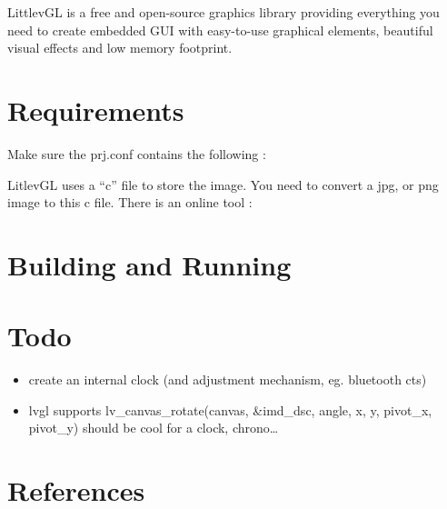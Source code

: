 \documentclass[letterpaper,10pt,english]{sphinxmanual}
\begin{document}
LittlevGL is a free and open-source graphics library providing everything you need to create embedded GUI with easy-to-use graphical elements, beautiful visual effects and low memory footprint.

\noindent{}


\section{Requirements}
\label{\detokenize{clock:requirements}}
Make sure the prj.conf contains the following :

\begin{sphinxVerbatim}[commandchars=\\\{\}]
\end{sphinxVerbatim}

LitlevGL uses a “c” file to store the image.
You need to convert a jpg, or png image to this c file.
There is an online tool : 


\section{Building and Running}
\label{\detokenize{clock:building-and-running}}
\begin{sphinxVerbatim}[commandchars=\\\{\}]
\end{sphinxVerbatim}


\section{Todo}
\label{\detokenize{clock:todo}}\begin{itemize}
\item {} 
create an internal clock (and adjustment mechanism, eg. bluetooth cts)

\item {} 
lvgl supports lv\_canvas\_rotate(canvas, \&imd\_dsc, angle, x, y, pivot\_x, pivot\_y) should be cool for a clock, chrono…

\end{itemize}


\section{References}
\label{\detokenize{clock:references}}
\end{document}
